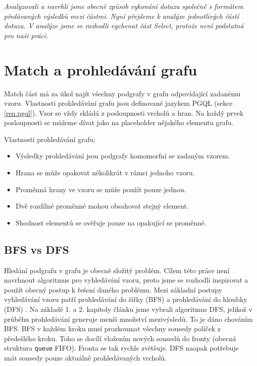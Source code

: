 \bigskip
\textit{Analyzovali a navrhli jsme obecně způsob vykonání dotazu společně s formátem předávaných výsledků mezi částmi. 
Nyní přejdeme k analýze jednotlivých částí dotazu. 
V analýze jsme se rozhodli vychenat část Select, protože není podstatná pro naši práci.}

\section{Match a prohledávání grafu} \label{anal.match}

Match část má za úkol najít všechny podgrafy v grafu odpovídající zadanému vzoru.
Vlastnosti prohledávání grafu jsou definované jazykem PGQL (sekce \ref{req.pgql}).
Vzor se vždy skládá z posloupnosti vrcholů a hran.
Na každý prvek posloupnosti se můžeme dívat jako na placeholder nějakého elementu grafu.

Vlastnosti prohledávání grafu:
\begin{itemize}

\item Výsledky prohledávání jsou podgrafy homomorfní se zadaným vzorem.
\item Hrana se může opakovat několikrát v rámci jednoho vzoru.
\item Proměnná hrany ve vzoru se může použít pouze jednou.
\item Dvě rozdílné proměnné mohou obsahovat stejný element.
\item Shodnost elementů se ověřuje pouze na opakující se proměnné.

\end{itemize}

\subsection{BFS vs DFS}

Hledání podgrafu v grafu je obecně složitý problém. 
Cílem této práce není navrhnout algoritmus pro vyhledávání vzoru, proto jsme se rozhodli inspirovat a použít obecný postup k řešení daného problému.
Mezi základní postupy vyhledávání vzoru patří prohledávání do šířky (BFS) a prohledávání do hloubky (DFS) \citep[kap. 4]{graphAlg}. 
Na základě 1. a 2. kapitoly článku \citet{asyncPGX} jsme vybrali algoritmus DFS, jelikož v průběhu prohledávání generuje menší množství mezivýsledů.
To je dáno chováním BFS. 
BFS v každém kroku musí prozkoumat všechny sousedy políček z předešlého kroku.
Toho se docílí vložením nových sousedů do fronty (obecná struktura \texttt{queue} FIFO).
Fronta se tak rychle zvětšuje.
DFS naopak potřebuje znát sousedy pouze aktuálně prohledávaných vrcholů.

